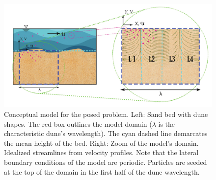 \documentclass[draft,linenumbers]{agujournal2018}
\begin{document}
\begin{figure}[ht]
\centering
\includegraphics[trim=0.2cm 0.2cm 0.2cm 0.2cm, width=35pc]
{190404_ConceptualW.pdf}
\caption{Conceptual model for the posed problem. Left: Sand bed with dune shapes. The red box outlines the model domain ($\lambda$ is the characteristic dune's wavelength). The cyan dashed line demarcates the mean height of the bed. Right: Zoom of the model's domain. Idealized streamlines from velocity profiles. Note that the lateral boundary conditions of the model are periodic. Particles are seeded at the top of the domain in the first half of the dune wavelength.}
\label{Conceptual}
\end{figure}
\end{document}
